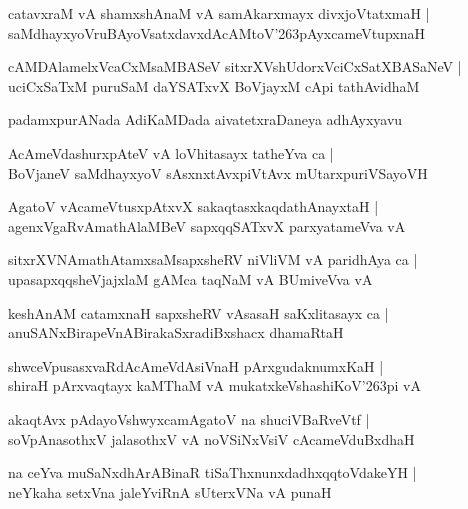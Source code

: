 \documentclass[twoside,12pt,openright]{book}
\def\S{\char'263}
\newcounter{shloka}[chapter]
\begin{document}
\begin{shloka}
catavxraM vA shamxshAnaM vA samAkarxmayx divxjoVtatxmaH |\\
saMdhayxyoVruBAyoVsatxdavxdAcAMtoV\S pAyxcameVtupxnaH 
\end{shloka}

\begin{shloka}
cAMDAlamelxVcaCxMsaMBASeV sitxrXVshUdorxVciCxSatXBASaNeV |\\
uciCxSaTxM puruSaM daYSATxvX BoVjayxM cApi tathAvidhaM
\end{shloka}

\begin{center}
padamxpurANada AdiKaMDada aivatetxraDaneya adhAyxyavu
\end{center}

\begin{shloka}
AcAmeVdashurxpAteV vA loVhitasayx tatheYva ca |\\
BoVjaneV saMdhayxyoV sAsxnxtAvxpiVtAvx mUtarxpuriVSayoVH 
\end{shloka}

\begin{shloka}
AgatoV vAcameVtusxpAtxvX sakaqtasxkaqdathAnayxtaH |\\
agenxVgaRvAmathAlaMBeV sapxqqSATxvX parxyatameVva vA 
\end{shloka}

\begin{shloka}
sitxrXVNAmathAtamxsaMsapxsheRV niVliVM vA paridhAya ca |\\
upasapxqqsheVjajxlaM gAMca taqNaM vA BUmiveVva vA 
\end{shloka}

\begin{shloka}
keshAnAM catamxnaH sapxsheRV vAsasaH saKxlitasayx ca |\\
anuSANxBirapeVnABirakaSxradiBxshacx dhamaRtaH 
\end{shloka}

\begin{shloka}
shwceVpusasxvaRdAcAmeVdAsiVnaH pArxgudaknumxKaH |\\
shiraH pArxvaqtayx kaMThaM vA mukatxkeVshashiKoV\S pi vA
\end{shloka}

\begin{shloka}
akaqtAvx pAdayoVshwyxcamAgatoV na shuciVBaRveVtf |\\
soVpAnasothxV jalasothxV vA noVSiNxVsiV cAcameVduBxdhaH 
\end{shloka}

\begin{shloka}
na ceYva muSaNxdhArABinaR tiSaThxnunxdadhxqqtoVdakeYH |\\
neYkaha setxVna jaleYviRnA sUterxVNa vA punaH 
\end{shloka}
\end{document}
